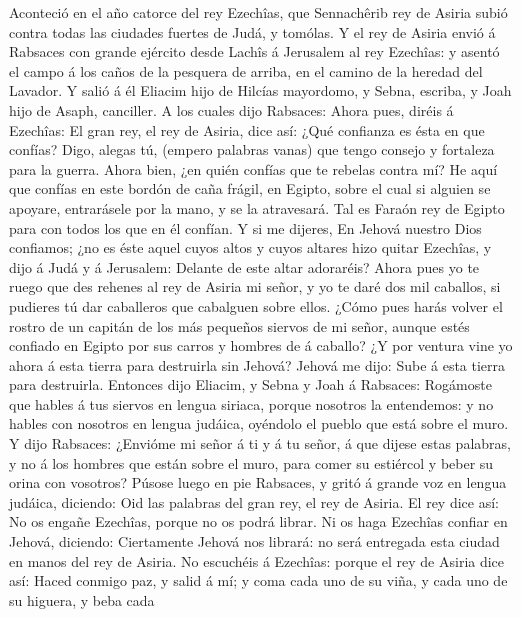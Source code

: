  Aconteció en el año catorce del rey Ezechîas, que
Sennachêrib rey de Asiria subió contra todas las ciudades fuertes de
Judá, y tomólas.  Y el rey de Asiria envió á Rabsaces con
grande ejército desde Lachîs á Jerusalem al rey Ezechîas: y asentó el
campo á los caños de la pesquera de arriba, en el camino de la heredad
del Lavador.  Y salió á él Eliacim hijo de Hilcías
mayordomo, y Sebna, escriba, y Joah hijo de Asaph, canciller.
 A los cuales dijo Rabsaces: Ahora pues, diréis á Ezechîas:
El gran rey, el rey de Asiria, dice así: ¿Qué confianza es ésta en que
confías?  Digo, alegas tú, (empero palabras vanas) que tengo
consejo y fortaleza para la guerra. Ahora bien, ¿en quién confías que te
rebelas contra mí?  He aquí que confías en este bordón de
caña frágil, en Egipto, sobre el cual si alguien se apoyare, entrarásele
por la mano, y se la atravesará. Tal es Faraón rey de Egipto para con
todos los que en él confían.  Y si me dijeres, En Jehová
nuestro Dios confiamos; ¿no es éste aquel cuyos altos y cuyos altares
hizo quitar Ezechîas, y dijo á Judá y á Jerusalem: Delante de este altar
adoraréis?  Ahora pues yo te ruego que des rehenes al rey de
Asiria mi señor, y yo te daré dos mil caballos, si pudieres tú dar
caballeros que cabalguen sobre ellos.  ¿Cómo pues harás
volver el rostro de un capitán de los más pequeños siervos de mi señor,
aunque estés confiado en Egipto por sus carros y hombres de á caballo?
 ¿Y por ventura vine yo ahora á esta tierra para destruirla
sin Jehová? Jehová me dijo: Sube á esta tierra para destruirla.
 Entonces dijo Eliacim, y Sebna y Joah á Rabsaces:
Rogámoste que hables á tus siervos en lengua siriaca, porque nosotros la
entendemos: y no hables con nosotros en lengua judáica, oyéndolo el
pueblo que está sobre el muro.  Y dijo Rabsaces: ¿Envióme
mi señor á ti y á tu señor, á que dijese estas palabras, y no á los
hombres que están sobre el muro, para comer su estiércol y beber su
orina con vosotros?  Púsose luego en pie Rabsaces, y gritó
á grande voz en lengua judáica, diciendo: Oid las palabras del gran rey,
el rey de Asiria.  El rey dice así: No os engañe Ezechîas,
porque no os podrá librar.  Ni os haga Ezechîas confiar en
Jehová, diciendo: Ciertamente Jehová nos librará: no será entregada esta
ciudad en manos del rey de Asiria.  No escuchéis á
Ezechîas: porque el rey de Asiria dice así: Haced conmigo paz, y salid á
mí; y coma cada uno de su viña, y cada uno de su higuera, y beba cada
